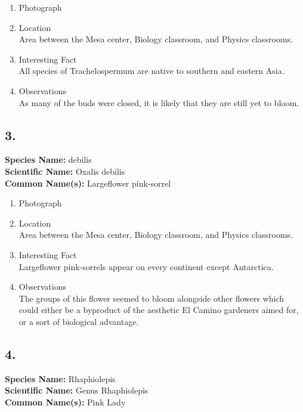 \documentclass{article}
\begin{document}
\begin{enumerate}[label = \textbf{\arabic*)}]
	\item Photograph
	\item Location \\
		Area between the Mesa center, Biology classroom, and Physics classrooms.
	\item Interesting Fact \\
		All species of Trachelospermum are native to southern and eastern Asia.
	\item Observations \\
		As many of the buds were closed, it is likely that they are still yet to bloom.
\end{enumerate}

\subsection{3.}
\textbf{Species Name: } debilis \\
\textbf{Scientific Name: } Oxalis debilis \\
\textbf{Common Name(s): } Largeflower pink-sorrel

\begin{enumerate}[label = \textbf{\arabic*)}]
	\item Photograph
	\item Location \\
		Area between the Mesa center, Biology classroom, and Physics classrooms.
	\item Interesting Fact \\
		Largeflower pink-sorrels appear on every continent except Antarctica.
	\item Observations \\
		The groups of this flower seemed to bloom alongside other flowers which could either be a byproduct of the aesthetic El Camino gardeners aimed for, or a sort of biological advantage.
\end{enumerate}

\subsection{4.}
\textbf{Species Name: } Rhaphiolepis \\
\textbf{Scientific Name: } Genus Rhaphiolepis \\
\textbf{Common Name(s): } Pink Lady
\end{document}
